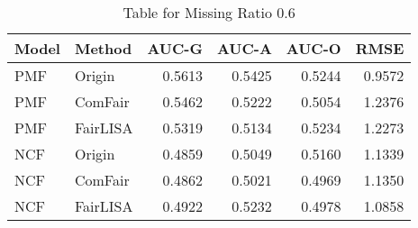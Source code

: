 \begin{table}
\centering
\caption{Table for Missing Ratio 0.6}
\label{tab:missing_0.6}
\begin{tabular}{llrrrr}
\toprule
Model &   Method &  AUC-G &  AUC-A &  AUC-O &   RMSE \\
\midrule
  PMF &   Origin & 0.5613 & 0.5425 & 0.5244 & 0.9572 \\
  PMF &  ComFair & 0.5462 & 0.5222 & 0.5054 & 1.2376 \\
  PMF & FairLISA & 0.5319 & 0.5134 & 0.5234 & 1.2273 \\
  NCF &   Origin & 0.4859 & 0.5049 & 0.5160 & 1.1339 \\
  NCF &  ComFair & 0.4862 & 0.5021 & 0.4969 & 1.1350 \\
  NCF & FairLISA & 0.4922 & 0.5232 & 0.4978 & 1.0858 \\
\bottomrule
\end{tabular}
\end{table}
